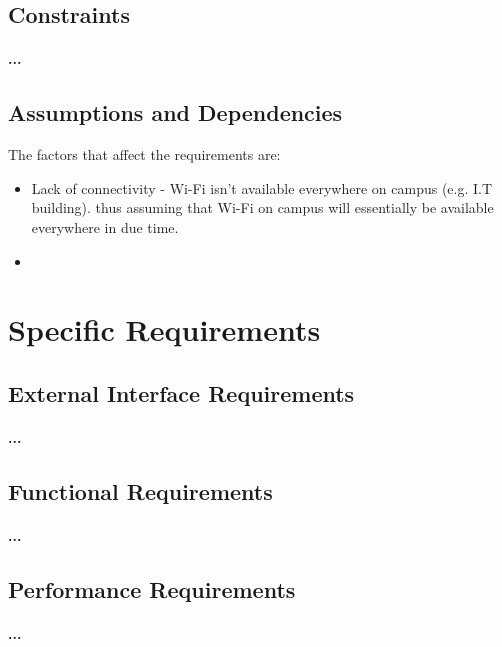 \documentclass[runningheads,a4paper]{llncs}
\begin{document}
\subsection{Constraints}
\paragraph{...}

\subsection{Assumptions and Dependencies}
\let\labelitemi\labelitemii
The factors that affect the requirements are:
\begin{itemize}
	 
		\item Lack of connectivity -  Wi-Fi isn't available everywhere on campus (e.g. I.T building). thus assuming that Wi-Fi on campus will essentially be available everywhere in due time.
		
		\item 
	 
\end{itemize}


\section{Specific Requirements}

\subsection{External Interface Requirements}
\paragraph{...}
\subsection{Functional Requirements}
\paragraph{...}
\subsection{Performance Requirements}
\paragraph{...}
\end{document}
